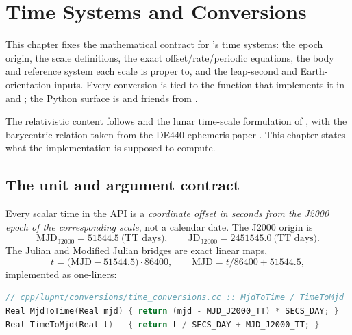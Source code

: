 \chapter{Time Systems and Conversions}
\label{chap:time-conversions}

This chapter fixes the mathematical contract for \lupnt{}'s time systems: the
epoch origin, the scale definitions, the exact offset/rate/periodic equations,
the body and reference system each scale is proper to, and the leap-second and
Earth-orientation inputs. Every conversion is tied to the function that
implements it in  and
; the Python surface is
 and friends from
.

The relativistic content follows \citep[Ch.~2.3]{iiyama2026thesis} and the
lunar time-scale formulation of \citet{turyshev2026cislunar}, with the
barycentric relation taken from the DE440 ephemeris paper
\citep{park2021de440}. This chapter states what the implementation is
supposed to compute.

\section{The unit and argument contract}
\label{sec:tc-contract}

Every scalar time in the API is a \emph{coordinate offset in seconds from the
J2000 epoch of the corresponding scale}, not a calendar date. The J2000 origin
is
%
\begin{equation}
\label{eq:tc-j2000}
  \mathrm{MJD}_{\mathrm{J2000}} = 51544.5\ \text{(TT days)},
  \qquad
  \mathrm{JD}_{\mathrm{J2000}}  = 2451545.0\ \text{(TT days)} .
\end{equation}
%
The Julian and Modified Julian bridges are exact linear maps,
%
\begin{equation}
\label{eq:tc-mjd}
  t = \bigl(\mathrm{MJD} - 51544.5\bigr)\cdot 86400,
  \qquad
  \mathrm{MJD} = t/86400 + 51544.5 ,
\end{equation}
%
implemented as one-liners:

\begin{lstlisting}[language=cpp,caption={Julian-date bridges.},label={lst:tc-mjd}]
// cpp/lupnt/conversions/time_conversions.cc :: MjdToTime / TimeToMjd
Real MjdToTime(Real mjd) { return (mjd - MJD_J2000_TT) * SECS_DAY; }
Real TimeToMjd(Real t)   { return t / SECS_DAY + MJD_J2000_TT; }
\end{lstlisting}

